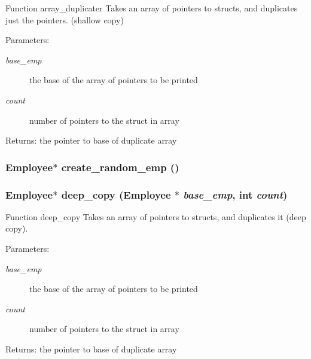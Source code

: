Function array\_\-duplicater Takes an array of pointers to structs, and duplicates just the pointers. (shallow copy) \begin{Desc}
\item[Parameters:]
\begin{description}
\item[{\em base\_\-emp}]the base of the array of pointers to be printed \item[{\em count}]number of pointers to the struct in array \end{description}
\end{Desc}
\begin{Desc}
\item[Returns:]the pointer to base of duplicate array \end{Desc}
\subsubsection{\setlength{\rightskip}{0pt plus 5cm}\bf{Employee}$\ast$ create\_\-random\_\-emp ()}\label{mystructs_8h_f06bb50a5a03bc9a0f1009c4fb8b929b}


\subsubsection{\setlength{\rightskip}{0pt plus 5cm}\bf{Employee}$\ast$ deep\_\-copy (\bf{Employee} $\ast$ {\em base\_\-emp}, int {\em count})}\label{mystructs_8h_28cc1a533d65340bcb9563bb5331e952}


Function deep\_\-copy Takes an array of pointers to structs, and duplicates it (deep copy). \begin{Desc}
\item[Parameters:]
\begin{description}
\item[{\em base\_\-emp}]the base of the array of pointers to be printed \item[{\em count}]number of pointers to the struct in array \end{description}
\end{Desc}
\begin{Desc}
\item[Returns:]the pointer to base of duplicate array \end{Desc}
